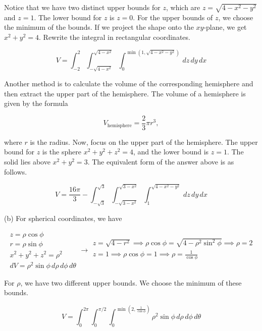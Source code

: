 \documentclass{article}
\begin{document}
\noindent Notice that we have two distinct upper bounds for $z$, which are $z=\sqrt{4-x^2-y^2}$ and $z=1$. The lower bound for $z$ is $z=0$. For the upper bounds of $z$, we choose the minimum of the bounds. If we project the shape onto the $xy$-plane, we get $x^2+y^2=4$. Rewrite the integral in rectangular coordinates.

\[\boxed{V=\int_{-2}^2\int_{-\sqrt{4-x^2}}^{\sqrt{4-x^2}}\int_0^{\min\left(1,\sqrt{4-x^2-y^2}\right)}\,dz\,dy\,dx}\]

\hfill

\noindent Another method is to calculate the volume of the corresponding hemisphere and then extract the upper part of the hemisphere. The volume of a hemisphere is given by the formula

\[V_{\text{hemisphere}}=\frac23\pi r^3,\]

\hfill

\noindent where $r$ is the radius. Now, focus on the upper part of the hemisphere. The upper bound for $z$ is the sphere $x^2+y^2+z^2=4$, and the lower bound is $z=1$. The solid lies above $x^2+y^2=3$. The equivalent form of the answer above is as follows.

\[\boxed{V=\frac{16\pi}3-\int_{-\sqrt3}^{\sqrt3}\int_{-\sqrt{3-x^2}}^{\sqrt{3-x^2}}\int_1^{\sqrt{4-x^2-y^2}}\,dz\,dy\,dx}\]

\hfill

\noindent (b) For spherical coordinates, we have

\[
\begin{array}{c}
z=\rho\cos\phi\\
r=\rho\sin\phi\\
x^2+y^2+z^2=\rho^2\\
dV=\rho^2\sin\phi\,d\rho\,d\phi\,d\theta
\end{array}\rightarrow
\begin{array}{c}
z=\sqrt{4-r^2}\implies\rho\cos\phi=\sqrt{4-\rho^2\sin^2\phi}\implies\rho=2\\
\displaystyle z=1\implies\rho\cos\phi=1\implies\rho=\frac1{\cos\phi}\\[1em]
\end{array}
\]

\hfill

\noindent For $\rho$, we have two different upper bounds. We choose the minimum of these bounds.

\[\boxed{V=\int_0^{2\pi}\int_{0}^{\pi/2}\int_0^{\min\left(2,\textstyle\frac1{\cos\phi}\right)}\rho^2\sin\phi\,d\rho\,d\phi\,d\theta}\]
\end{document}
